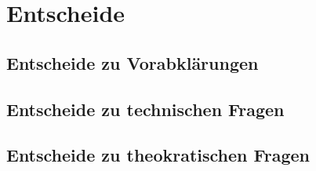 \chapter{Entscheide}

\section{Entscheide zu Vorabklärungen}

\section{Entscheide zu technischen Fragen}

\section{Entscheide zu theokratischen Fragen}